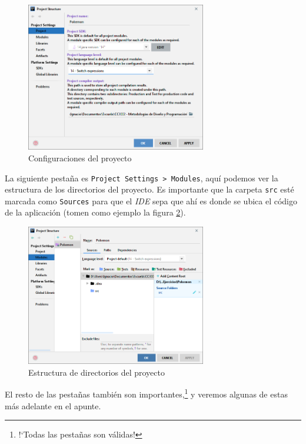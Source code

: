   \begin{figure}[ht!]
    \centering
    \includegraphics[width=0.7\textwidth]{img/Profundizando en Java/IntelliJ Project Settings.png}
    \caption{Configuraciones del proyecto}
    \label{fig:ij-project-settings}
  \end{figure}

  La siguiente pestaña es \texttt{Project Settings > Modules}, aquí podemos ver la estructura de los
  directorios del proyecto.
  Es importante que la carpeta \texttt{src} esté marcada como \texttt{Sources} para que el 
  \textit{IDE} sepa que ahí es donde se ubica el código de la aplicación (tomen como ejemplo la 
  figura \ref{fig:ij-modules}).

  \begin{figure}[ht!]
    \centering
    \includegraphics[width=0.7\textwidth]{img/Profundizando en Java/IntelliJ Project Modules.png}
    \caption{Estructura de directorios del proyecto}
    \label{fig:ij-modules}
  \end{figure}

  El resto de las pestañas también son importantes,\footnote{!`Todas las pestañas son válidas!} y 
  veremos algunas de estas más adelante en el apunte.
%